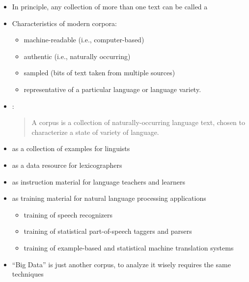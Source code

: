 \documentclass[a4paper,landscape,headrule,footrule,xetex]{foils}
\begin{document}
\begin{itemize}
\item  In principle, any collection of more than one text can be called a
\item  Characteristics of modern corpora:
  \begin{itemize}
  \item machine-readable (i.e., computer-based)
  \item authentic (i.e., naturally occurring)
  \item sampled (bits of text taken from multiple sources)
  \item representative of a particular language or language variety.
  \end{itemize}
\item  \citet[171]{Sinclair:1991}:
  \begin{quote}
    A corpus is a collection of naturally-occurring language text, chosen to characterize a state of variety of language.
\end{quote}
\end{itemize}


\begin{itemize}
\item as a collection of examples for linguists
\item as a data resource for lexicographers
\item as instruction material for language teachers and learners
\item as training material for natural language processing applications
  \begin{itemize}
  \item training of speech recognizers
  \item training of statistical part-of-speech taggers and parsers
  \item training of example-based and statistical machine translation systems
  \end{itemize}
\item ``Big Data'' is just another corpus, to analyze it wisely
  requires the same techniques

\end{itemize}



\end{document}
